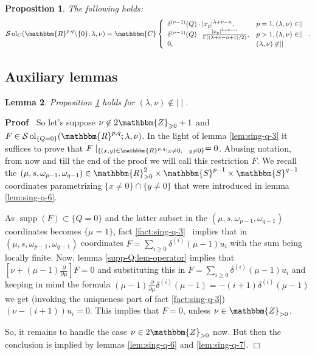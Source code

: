 \documentclass[12pt]{article}
\newcommand{\nin}{\not\in}
\newcommand{\tmop}[1]{\ensuremath{\operatorname{#1}}}
\renewenvironment{proof}{\noindent\textbf{Proof\ }}{\hspace*{\fill}$\Box$\medskip}
\newtheorem{proposition}{Proposition}[section]
\newtheorem{lemma}[proposition]{Lemma}
\theoremstyle{remark}
\newcommand{\supp}{\tmop{supp}}
\newcommand{\Z}{\mathbbm{Z}}
\newcommand{\R}{\mathbbm{R}}
\newcommand{\mysbra}[1]{\left[ #1 \right]}
\begin{document}
\begin{proposition}
  \label{sol-MO:prop-solCnonzero}The following holds:
  \[ \mathcal{S} \tmop{ol}_C (\mathbbm{R}^{p, q} \backslash \{ 0 \} ; \lambda,
     \nu) =\mathbbm{C} \left\{ \begin{array}{ll}
       \delta^{(\nu - 1)} (Q) \cdot | x_p |^{\lambda + \nu - n}, & p = 1,
       (\lambda, \nu) \in \mid \mid\\
       \delta^{(\nu - 1)} (Q) \cdot \frac{| x_p |^{\lambda + \nu - n}}{\Gamma
       ((\lambda + \nu - n + 1) / 2)}, & p > 1, (\lambda, \nu) \in \mid \mid\\
       0, & (\lambda, \nu) \nin \mid \mid
     \end{array} \right. . \]
\end{proposition}

\subsection{Auxiliary lemmas}

\begin{lemma}
  \label{uniq-c:lem-generic}Proposition \ref{sol-MO:prop-solCnonzero} holds
  for $(\lambda, \nu) \nin \mid \mid$.
\end{lemma}

\begin{proof}
  So let's suppose $\nu \nin 2\mathbbm{Z}_{\geqslant 0} + 1$ and $F \in
  \mathcal{S} \tmop{ol}_{\{ Q = 0 \}} (\mathbbm{R}^{p, q} ; \lambda, \nu)$. In
  the light of lemma \ref{lem:sing-q-3} it suffices to prove that $F
  \mid_{\{ (x, y) \in \R^{p, q} |x \neq 0, \hspace{0.75em} y \neq 0\}} =
  0$. Abusing notation, from now and till the end of the proof we will call
  this restriction $F$. We recall the $(\mu, s, \omega_{p - 1}, \omega_{q -
  1}) \in \mathbbm{R}_{> 0}^2 \times \mathbbm{S}^{p - 1} \times \mathbbm{S}^{q
  - 1}$ coordinates parametrizing $\{ x \neq 0 \} \cap \{ y \neq 0 \}$ that
  were introduced in lemma \ref{lem:sing-q-6}.
  
  As $\supp (F) \subset \{ Q = 0 \}$ and the latter subset in the $(\mu, s,
  \omega_{p - 1}, \omega_{q - 1})$ coordinates becomes $\{ \mu = 1 \}$, fact
  \ref{fact:sing-q-3} \ implies that in $(\mu, s, \omega_{p - 1}, \omega_{q -
  1})$ coordinates $F = \sum_{i \geq 0} \delta^{(i)}  (\mu - 1) u_i$ with the
  sum being locally finite. Now, lemma \ref{supp-Q:lem-operator} implies that
  $\mysbra{\nu + (\mu - 1)  \frac{\partial}{\partial \mu}} F = 0$ and
  substituting this in $F = \sum_{i \geq 0} \delta^{(i)}  (\mu - 1) u_i$ and
  keeping in mind the formula $(\mu - 1)  \frac{\partial}{\partial \mu}
  \delta^{(i)}  (\mu - 1) = - (i + 1) \delta^{(i)}  (\mu - 1)$ we get
  (invoking the uniqueness part of fact \ref{fact:sing-q-3}) $(\nu - (i + 1))
  u_i = 0$. This implies that $F = 0$, unless $\nu \in \Z_{> 0}$.
  
  So, it remains to handle the case $\nu \in 2\mathbbm{Z}_{> 0}$ now. But then
  the conclusion is implied by lemmas \ref{lem:sing-q-6} and
  \ref{lem:sing-q-7}.
\end{proof}
\end{document}
